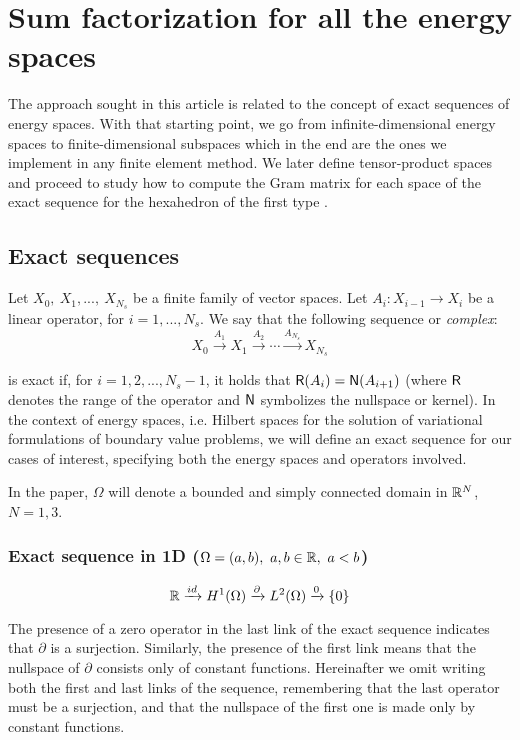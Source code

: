 \section{Sum factorization for all the energy spaces}

The approach sought in this article is related to the concept of exact sequences of energy spaces. With that starting point, we go from infinite-dimensional energy spaces to finite-dimensional subspaces which in the end are the ones we implement in any finite element method. We later define tensor-product spaces and proceed to study how to compute the Gram matrix for each space of the exact sequence for the hexahedron of the first type \cite{Nedelec80}.

\subsection{Exact sequences}

Let $X_0,\ X_1, ...,\ X_{N_s}$ be a finite family of vector spaces. Let $A_i:X_{i-1}\longrightarrow X_i$ be a linear operator, for $i=1,...,N_s$. We say that the following sequence or \textit{complex}:
% 
\begin{equation*}
    X_0\xrightarrow{A_1}X_1\xrightarrow{A_2}\dotsm\xrightarrow{A_{N_s}}X_{N_s}
\end{equation*}

\noindent is exact if, for $i=1,2,...,N_{s}-1$, it holds that $\mathsf{R}(A_i)=\mathsf{N}(A_{i+1})$ (where $\mathsf{R}$ denotes the range of the operator and $\mathsf{N}$ symbolizes the nullspace or kernel). In the context of energy spaces, i.e. Hilbert spaces for the solution of variational formulations of boundary value problems, we will define an exact sequence for our cases of interest, specifying both the energy spaces and operators involved.

In the paper, $\Omega$ will denote a bounded and simply connected domain in $\mathbb{R}^N$, $N=1,3$.

\subsubsection{Exact sequence in 1D ($\Omega=(a,b),\ a,b\in\R,\ a<b$)}
% 
\begin{equation*}
    \mathbb{R}\xrightarrow{id}H^1(\Omega)\xrightarrow{\partial}L^2(\Omega)\xrightarrow{0}\{0\}
\end{equation*}

The presence of a zero operator in the last link of the exact sequence indicates that $\partial$ is a surjection. Similarly, the presence of the first link means that the nullspace of $\partial$ consists only of constant functions. Hereinafter we omit writing both the first and last links of the sequence, remembering that the last operator must be a surjection, and that the nullspace of the first one is made only by constant functions.

